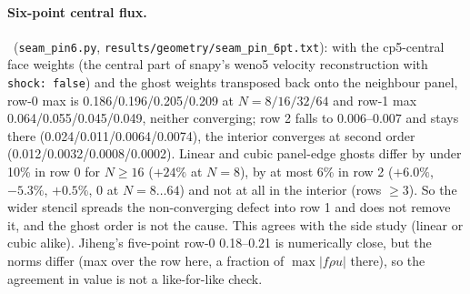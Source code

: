 \paragraph{Six-point central flux.}\measured\ (\texttt{seam\_pin6.py}, \texttt{results/geometry/seam\_pin\_6pt.txt}):
with the cp5-central face weights (the central part of snapy's weno5 velocity reconstruction with
\texttt{shock: false}) and the ghost weights transposed back onto the neighbour panel, row-0 max is
0.186/0.196/0.205/0.209 at $N=8/16/32/64$ and row-1 max 0.064/0.055/0.045/0.049, neither converging; row 2 falls to
$0.006$--$0.007$ and stays there (0.024/0.011/0.0064/0.0074), the interior converges at second order
(0.012/0.0032/0.0008/0.0002). Linear and cubic panel-edge ghosts differ by under 10\% in row 0 for $N\ge16$
($+24\%$ at $N=8$), by at most 6\% in row 2 ($+6.0\%$, $-5.3\%$, $+0.5\%$, $0$ at $N=8\ldots64$) and not at all in
the interior (rows $\ge3$). So the wider stencil spreads the non-converging defect into row 1 and does not remove it,
and the ghost order is not the cause. This agrees with the side study (linear or cubic alike). Jiheng's five-point
row-0 0.18--0.21 is numerically close, but the norms differ (max over the row here, a fraction of $\max|f\rho u|$
there), so the agreement in value is not a like-for-like check.
